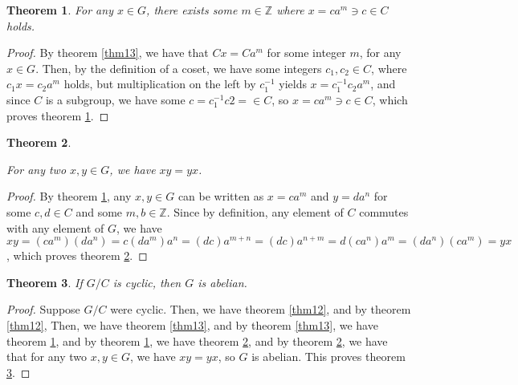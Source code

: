 \documentclass[12pt]{article}
\newcommand{\ints}{\mathbb{Z}}
\newtheorem{thm}{Theorem}
\begin{document}
\begin{thm} \label{thm14}
	For any $x \in G$, there exists some $m \in \ints$ where $x = ca^m \ni c \in C$ holds.
\end{thm}

\begin{proof}
	By theorem \ref{thm13},
	we have that $Cx = Ca^m$
	for some integer $m$,
	for any $x \in G$.
	Then, by the definition of a coset,
	we have some integers $c_1,c_2 \in C$,
	where $c_1x = c_2a^m$ holds,
	but multiplication on the left by $c_1^{-1}$
	yields $x = c_1^{-1}c_2a^m$,
	and since $C$ is a subgroup,
	we have some $c = c_1^{-1}c2 = \in C$,
	so $x = ca^m \ni c \in C$,
	which proves theorem \ref{thm14}.
\end{proof}

\begin{thm} \label{thm15}

	For any two $x,y \in G$, we have $xy = yx$.
\end{thm}

\begin{proof}
	By theorem \ref{thm14},
	any $x,y \in G$ can be written as
	$x = ca^m$ and $y = da^n$
	for some $c,d \in C$
	and some $m,b \in \ints$.
	Since by definition,
	any element of $C$ commutes
	with any element of $G$,
	we have $xy = (ca^m)(da^n) = c(da^m)a^n = (dc)a^{m + n}
	= (dc)a^{n + m} = d(ca^n)a^m = (da^n)(ca^m) = yx$,
	which proves theorem \ref{thm15}.
\end{proof}

\begin{thm} \label{thm16}
	If $G/C$ is cyclic, then $G$ is abelian.
\end{thm}

\begin{proof}
	Suppose $G/C$ were cyclic.
	Then, we have theorem \ref{thm12},
	and by theorem \ref{thm12},
	Then, we have theorem \ref{thm13},
	and by theorem \ref{thm13},
	we have theorem \ref{thm14},
	and by theorem \ref{thm14},
	we have theorem \ref{thm15},
	and by theorem \ref{thm15},
	we have that for any two
	$x,y \in G$, we have $xy = yx$,
	so $G$ is abelian.
	This proves theorem \ref{thm16}.
\end{proof}
\end{document}
